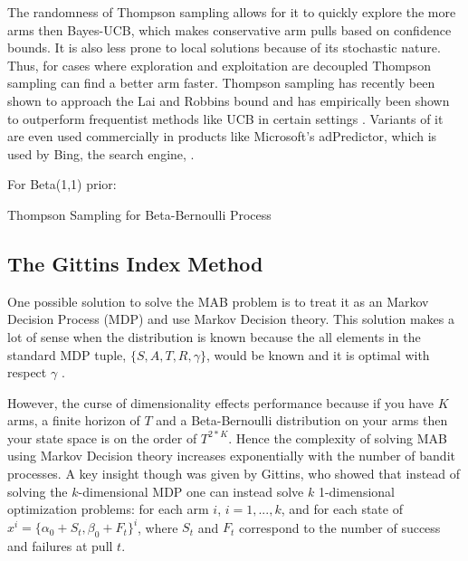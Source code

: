 \documentclass[journal,transmag]{IEEEtran}%
\begin{document}
The randomness of Thompson sampling allows for it to quickly explore the more arms then Bayes-UCB, which makes conservative arm pulls based on confidence bounds. It is also less prone to local solutions because of its stochastic nature. Thus, for cases where exploration and exploitation are decoupled Thompson sampling can find a better arm faster. Thompson sampling has recently been shown to approach the Lai and Robbins bound \cite{agrawal2011analysis} and has  empirically been shown to outperform frequentist methods like UCB in certain settings \cite{chapelle2011empirical}. Variants of it are even used commercially in products like Microsoft's adPredictor, which is used by Bing, the search engine, \cite{graepel2010web}. 
\begin{algorithm}
 For Beta(1,1) prior: \\
 \caption{Thompson Sampling for Beta-Bernoulli Process}
\end{algorithm}



\subsection{The Gittins Index Method} 
One possible solution to solve the MAB problem is to treat it as an Markov Decision Process (MDP) and use Markov Decision theory. This solution makes a lot of sense when the distribution is known because the all elements in the standard MDP tuple, $\lbrace S,A,T,R,\gamma \rbrace$, would be known and it is optimal with respect $\gamma$ \cite{weber1992gittins}. 

However, the curse of dimensionality effects performance because if you have $K$ arms, a finite horizon of $T$ and a Beta-Bernoulli distribution on your arms then your state space is on the order of $T^{2*K}$. Hence the complexity of solving MAB using Markov Decision theory increases exponentially with the number of bandit processes. A key insight though was given by Gittins, who showed that instead of solving the $k$-dimensional MDP one can instead solve $k$ 1-dimensional optimization problems: for each arm $i$, $i= 1,...,k$, and for each state of $x^i = \lbrace \alpha_0 +S_t, \beta_0 +F_t \rbrace^i$, where $S_t$ and $F_t$ correspond to the number of success and failures at pull $t$. 
\end{document}
